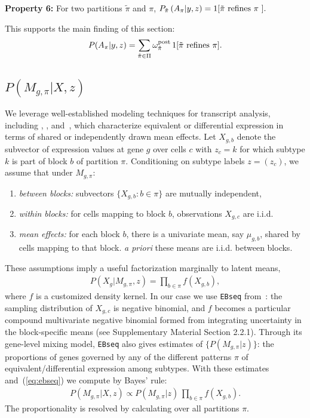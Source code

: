 \documentclass[aoas,preprint]{imsart}
\begin{document}
\noindent
{\bf Property 6:} For two partitions $\tilde \pi$ and $\pi$,  
$P_{\tilde \pi}\left( A_{\pi} | y,z \right) = 1[ {\mbox {\rm $\tilde \pi$ refines $\pi$ }}].$

This supports the main finding of this section:
\begin{eqnarray}
\label{eq:mainfinding}
P(A_\pi|y,z) = 
\sum_{\tilde \pi \in \Pi} \omega^{\rm post}_{\tilde \pi} \,  1[ {\mbox {\rm $\tilde \pi$ refines $\pi$}} ].
\end{eqnarray}


\subsection{$P(M_{g,\pi}|X,z)$}
We leverage well-established modeling techniques for transcript analysis, including
\cite{ref:Leng}, \cite{Kendziorski:2003aa}, and~\cite{Jensen:2009aa}, which characterize
 equivalent or differential expression in terms of shared or independently drawn mean effects.  Let
$X_{g,b}$ denote
the subvector of expression values at gene $g$ over cells $c$ with $z_c=k$ for which subtype $k$ is part of
 block $b$ of partition $\pi$.  Conditioning on subtype labels $z=(z_c)$,  we assume that under $M_{g, \pi}$: 
\begin{enumerate}
\item {\em between blocks:} subvectors $\{ X_{g,b}: b \in \pi \}$ are mutually independent,
\item {\em within blocks:} for cells mapping to block $b$, observations $X_{g,c}$ are i.i.d. 
\item {\em mean effects:}  for each block $b$, there is a univariate mean, say $\mu_{g,b}$, 
 shared by cells mapping to that block.  {\em a priori} these means are i.i.d.  between blocks.
\end{enumerate}
These assumptions imply a useful factorization marginally to latent means,
\begin{eqnarray}
\label{eq:ebseq}
P(X_g|M_{g,\pi}, z) = \prod_{b \in \pi} f(X_{g,b}),
\end{eqnarray}
where $f$ is a customized density kernel.  In our case we use \verb+EBseq+ from~\cite{ref:Leng}: 
the sampling distribution of
 $X_{g,c}$ is negative binomial, and $f$ becomes a particular compound multivariate 
negative binomial formed from integrating
uncertainty in the block-specific means (see Supplementary Material Section 2.2.1).  
Through its gene-level mixing model,
\verb+EBseq+ also gives estimates of $\{ P(M_{g,\pi}|z) \}$: the proportions of genes governed by any of the 
different patterns $\pi$ of equivalent/differential expression among subtypes. With these estimates 
and~(\ref{eq:ebseq}) we compute by Bayes' rule:
\begin{eqnarray*}
P(M_{g,\pi}|X,z) \propto P(M_{g,\pi}|z) \, \prod_{b \in \pi} f(X_{g,b}).
\end{eqnarray*}
The proportionality is resolved by calculating over all partitions $\pi$.
\end{document}

